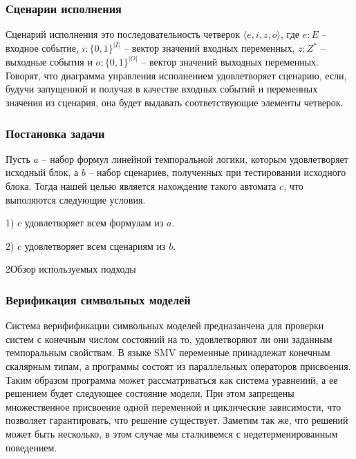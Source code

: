 \documentclass[14pt]{extarticle}
\makeatletter
\theoremstyle{plain}
\theoremstyle{definition}
\renewcommand{\subsection}{\@startsection{subsection}{2}{0mm}%
{2\baselineskip}{\baselineskip}{\bfseries\large\itshape}}
\makeatother
\begin{document}
\subsubsection{Сценарии исполнения}

Сценарий исполнения это последовательность четверок $\langle e, i, z, o
\rangle$, где $e : E$ -- входное событие, $i : \{0, 1\}^{|I|}$ -- вектор
значений входных переменных, $z : Z^*$ -- выходные события и $o :
\{0, 1\}^{|O|}$ -- вектор значений выходных переменных. Говорят, что диаграмма
управления исполнением удовлетворяет сценарию, если, будучи запущенной и
получая в качестве входных событий и переменных значения из сценария, она будет
выдавать соответствующие элементы четверок.

\subsubsection{Постановка задачи}

Пусть $a$ -- набор формул линейной темпоральной логики, которым удовлетворяет
исходный блок, а $b$ -- набор сценариев, полученных при тестировании исходного
блока. Тогда нашей целью является нахождение такого автомата $c$, что
выполяются следующие условия.

1) $c$ удовлетворяет всем формулам из $a$.

2) $c$ удовлетворяет всем сценариям из $b$.

\subsection{Обзор используемых подходы}
\subsubsection{Верификация символьных моделей}

Система верифификации символьных моделей предназанчена для проверки систем с
конечным числом состояний на то, удовлетворяют ли они заданным темпоральным
свойствам. В языке SMV переменные принадлежат конечным скалярным типам, а
программы состоят из параллельных операторов присвоения. Таким образом
программа может рассматриваться как система уравнений, а ее решением будет
следующее состояние модели. При этом запрещены множественное присвоение одной
переменной и циклические зависимости, что позволяет гарантировать, что решение
существует. Заметим так же, что решений может быть несколько, в этом случае мы
сталкивемся с недетерменированным поведением.
\end{document}
